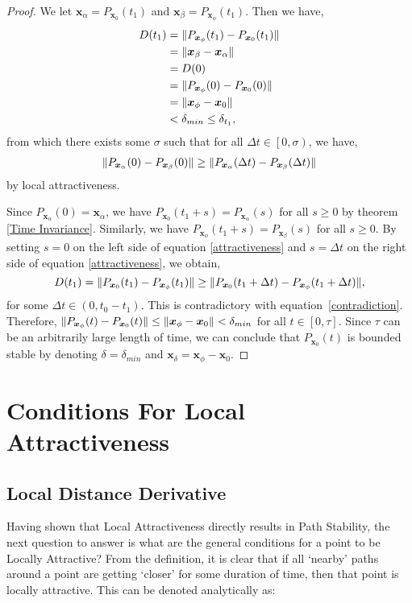 \documentclass{article}
\newcommand{\B}[1]{\boldsymbol{#1}}
\DeclarePairedDelimiter\norm{\lVert}{\rVert}%
\theoremstyle{definition}
\theoremstyle{remark}
\begin{document}
\begin{proof}
  We let $\B{x}_\alpha = P_{\B{x}_0}(t_1)$ and $\B{x}_\beta = P_{\B{x}_\phi}(t_1)$. Then we have,
  \begin{align}
  D(t_1) &= \norm{P_{\B{x}_\phi}(t_1)-P_{\B{x}_0}(t_1)} \nonumber\\
  &= \norm{\B{x}_\beta - \B{x}_\alpha} \nonumber\\
  &= D(0) \nonumber\\
  & = \norm{P_{\B{x}_\phi}(0)-P_{\B{x}_0}(0)} \nonumber\\
  &= \norm{\B{x}_\phi - \B{x}_0} \nonumber\\
  &< \delta_{min} \leq \delta_{t_1},
  \end{align}
  from which there exists some $\sigma$ such that for all $\Delta t \in \left[0, \sigma\right)$, we have,
  \begin{align}
  \norm{P_{\B{x}_\alpha}(0) - P_{\B{x}_\beta}(0)} \ge \norm{P_{\B{x}_\alpha}(\Delta t) - P_{\B{x}_{\beta}}(\Delta t)} \label{attractiveness}
  \end{align}
  by local attractiveness.
      
  Since $P_{\B{x}_\alpha}(0) = \B{x}_\alpha$, we have $P_{\B{x}_0}(t_1 + s) = P_{\B{x}_\alpha}(s)$   for all $s \geq 0$ by theorem \ref{Time Invariance}. Similarly, we have $P_{\B{x}_\phi}(t_1 + s) = P_{\B{x}_\beta}(s)$ for all $s \geq 0$. By setting $s=0$ on the left side 
  of equation \ref{attractiveness} and $s=\Delta t$ on the right side of equation \ref{attractiveness}, we obtain,
  $$
  D(t_1) = \norm{P_{\B{x}_0}(t_1) - P_{\B{x}_\phi}(t_1)} \geq \norm{P_{\B{x}_0}(t_1 + \Delta t) - P_{\B{x}_\phi}(t_1 + \Delta t)},
  $$
  for some $\Delta t \in \left(0, t_0 - t_1\right)$. This is contradictory with equation~\ref{contradiction}.  
  Therefore, $\norm{P_{\B{x}_\phi}(t)-P_{\B{x}_0}(t)} \leq \norm{\B{x}_\phi - \B{x}_0} < \delta_{min}$ for all
  $t \in [0, \tau]$. Since $\tau$ can be an arbitrarily large length of time, we can conclude that $P_{\B{x}_0}(t)$ is bounded stable by denoting
  $\delta=\delta_{min}$ and $\B{x}_\delta=\B{x}_\phi - \B{x}_0$.
\end{proof}

\section{Conditions For Local Attractiveness}
\subsection{Local Distance Derivative}
Having shown that Local Attractiveness directly results in Path Stability, the 
next question to answer is what are the general conditions for a point to be Locally Attractive?
From the definition, it is clear that if all `nearby' paths around a point are getting `closer'
for some duration of time, then that point is locally attractive. This can be denoted analytically as: 
\end{document}
